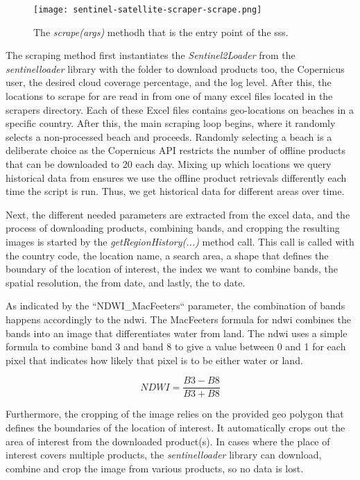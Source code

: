 \begin{figure}[h!]
    \centering
    \texttt{[image: sentinel-satellite-scraper-scrape.png]}
    \caption{The \emph{scrape(args)} methodh that is the entry point of the \acrshort{sss}.}
    \label{fig:sentinel-satellite-scraper-scrape}
\end{figure}

The scraping method first instantiates the \emph{Sentinel2Loader} from the \emph{sentinelloader} library with the folder to download products too, the Copernicus user, the desired cloud coverage percentage, and the log level. After this, the locations to scrape for are read in from one of many excel files located in the scrapers directory. Each of these Excel files contains geo-locations on beaches in a specific country. After this, the main scraping loop begins, where it randomly selects a non-processed beach and proceeds. Randomly selecting a beach is a deliberate choice as the Copernicus API restricts the number of offline products that can be downloaded to 20 each day. Mixing up which locations we query historical data from ensures we use the offline product retrievals differently each time the script is run. Thus, we get historical data for different areas over time.

Next, the different needed parameters are extracted from the excel data, and the process of downloading products, combining bands, and cropping the resulting images is started by the \emph{getRegionHistory(...)} method call. This call is called with the country code, the location name, a search area, a shape that defines the boundary of the location of interest, the index we want to combine bands, the spatial resolution, the from date, and lastly, the to date.

As indicated by the ``NDWI\_MacFeeters`` parameter, the combination of bands happens accordingly to the \acrfull{ndwi}. The MacFeeters formula for \acrshort{ndwi} combines the bands into an image that differentiates water from land. The \acrshort{ndwi} uses a simple formula to combine band 3 and band 8 to give a value between 0 and 1 for each pixel that indicates how likely that pixel is to be either water or land.

\[ NDWI = \dfrac{B3 - B8}{B3 + B8} \]

Furthermore, the cropping of the image relies on the provided geo polygon that defines the boundaries of the location of interest. It automatically crops out the area of interest from the downloaded product(s). In cases where the place of interest covers multiple products, the \emph{sentinelloader} library can download, combine and crop the image from various products, so no data is lost.

